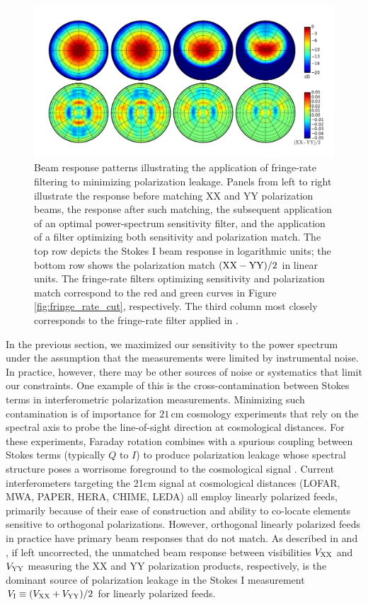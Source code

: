 \documentclass[twocolumn,apj,numberedappendix]{emulateapj}
\begin{document}
\begin{figure}\centering
\includegraphics[width=1.9\columnwidth]{plots/pol_match.png}
\caption{
Beam response patterns illustrating the application of fringe-rate filtering to minimizing polarization leakage.
Panels from left to right illustrate the
response before matching XX and YY polarization beams, the response after such matching, 
the subsequent application of an optimal power-spectrum sensitivity filter, and the
application of a filter optimizing both sensitivity and polarization match.
The top row depicts the Stokes I beam response in logarithmic units; the
bottom row shows the polarization match ${\rm (XX-YY)}/2$ in linear units.
The fringe-rate filters optimizing sensitivity and polarization match correspond
to the red and green curves in Figure \ref{fig:fringe_rate_cut}, respectively.
The third column most closely corresponds to the fringe-rate filter applied in \citet{ali_et_al2015}.
}\label{fig:pol_match}
\end{figure}

In the previous section, we maximized our sensitivity to the power spectrum under the assumption that the measurements were limited by instrumental noise. In practice, however, there may be other sources of noise or systematics that limit our constraints. One example of this is the cross-contamination between Stokes terms in interferometric polarization measurements. Minimizing such contamination is of importance for $21\,\textrm{cm}$ cosmology experiments that rely on
the spectral axis to probe the line-of-sight direction at cosmological distances.  For these
experiments, Faraday rotation combines
with a spurious coupling between Stokes terms (typically $Q$ to $I$) to produce polarization leakage whose 
spectral structure poses a worrisome foreground
to the cosmological signal \citep{jelic_et_al2008,jelic_et_al2010,jelic_et_al2014,bernardi_et_al2013,moore_et_al2013,moore_et_al2015}.  Current interferometers
targeting the 21cm signal at cosmological distances (LOFAR, MWA, PAPER, HERA, CHIME, LEDA) all employ linearly
polarized feeds, primarily because of their ease of construction and ability to co-locate elements sensitive to
orthogonal polarizations.  However, orthogonal linearly polarized feeds in practice have primary beam responses
that do not match.  As described in \citet{moore_et_al2013} and \citet{jelic_et_al2010}, if left uncorrected, the unmatched beam response 
between visibilities ${V_{\rm XX}}$ and ${V_{\rm YY}}$ measuring the XX and YY polarization products, respectively, is the 
dominant source of polarization leakage in the Stokes I measurement ${V_{\rm I}}\equiv({V_{\rm XX}}+{V_{\rm YY}})/2$ for
linearly polarized feeds.
\end{document}
